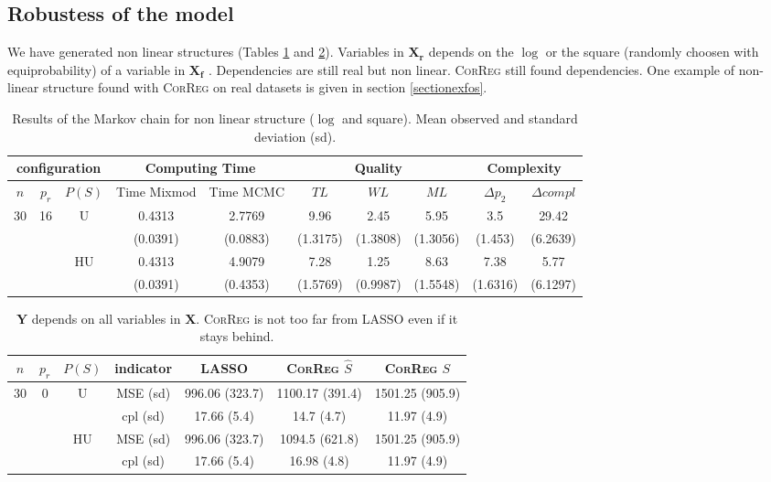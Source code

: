 \documentclass[11pt,a4paper]{article}
\begin{document}
\subsection{Robustess of the model}
 We have generated non linear structures (Tables \ref{compZnonlin} and \ref{resYnonlin}). Variables in $\boldsymbol{X_r}$ depends on the $\log$ or the square (randomly choosen with equiprobability) of a variable in $\boldsymbol{X_f}$ . Dependencies are still real but non linear. \textsc{CorReg} still found dependencies. One example of non-linear structure found with \textsc{CorReg} on real datasets is given in section \ref{sectionexfos}.
\begin{table}[h!]
\centering
\begin{tabular}{|c|c|c|c|c|c|c|c|c|c|}
\hline
\multicolumn{3}{|c}{configuration}  &  \multicolumn{2}{|c}{Computing Time}  & \multicolumn{3}{|c}{Quality} & \multicolumn{2}{|c|}{Complexity}\\
\hline
$n$ & $p_r$ & $P(S)$&Time Mixmod  & Time MCMC  & $TL$ & $WL$ & $ML$ & $\Delta p_2$ & $\Delta compl$ \\
\hline
30 & 16 & U& 0.4313 & 2.7769 & 9.96 & 2.45 & 5.95 & 3.5 & 29.42  \\
& & &(0.0391) & (0.0883) & (1.3175) & (1.3808) & (1.3056) & (1.453) & (6.2639) \\
 &  & HU & 0.4313 & 4.9079 & 7.28 & 1.25 & 8.63 & 7.38 & 5.77  \\ 
& & &(0.0391) & (0.4353) & (1.5769) & (0.9987) & (1.5548) & (1.6316) & (6.1297) \\ 
\hline
\end{tabular} 
\caption{Results of the Markov chain for non linear structure ($\log$ and square). Mean observed and standard deviation (sd). } \label{compZnonlin}
\end{table}


\begin{table}[h!]
\centering
\begin{tabular}{|c|c|c|c|c|c|c|}
\hline 
$n$ & $p_r$& $P(S)$ &indicator &LASSO  &    \textsc{CorReg} $\hat S$& \textsc{CorReg} $S$\\ 
\hline %
30 & 0 & U&MSE (sd) & 996.06 (323.7) & 1100.17 (391.4) & 1501.25 (905.9) \\
& & &cpl (sd) & 17.66 (5.4) & 14.7 (4.7) & 11.97 (4.9) \\
 &  &HU &MSE (sd) & 996.06 (323.7) & 1094.5 (621.8) & 1501.25 (905.9) \\
& & & cpl (sd) & 17.66 (5.4) & 16.98 (4.8) & 11.97 (4.9) \\ 
\hline
\end{tabular} 
\caption{ $\boldsymbol{Y}$ depends on all variables in $\boldsymbol{X}$. \textsc{CorReg} is not too far from LASSO even if it stays behind. } \label{resYnonlin}
\end{table}
\end{document}
